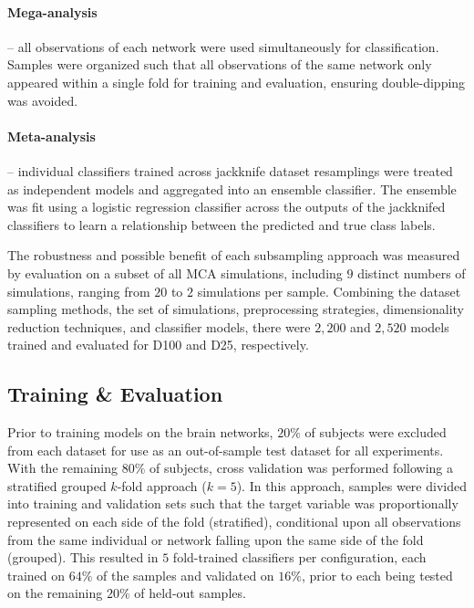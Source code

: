 \documentclass[fleqn,10pt]{SelfArx} %
\begin{document}
\paragraph{Mega-analysis} – all observations of each network were used simultaneously for classification. Samples were
organized such that all observations of the same network only appeared within a single fold for training and
evaluation, ensuring double-dipping was avoided.

\paragraph{Meta-analysis} – individual classifiers trained across jackknife dataset resamplings were treated as
independent models and aggregated into an ensemble classifier. The ensemble was fit using a logistic regression
classifier across the outputs of the jackknifed classifiers to learn a relationship between the predicted and true
class labels.

The robustness and possible benefit of each subsampling approach was measured by evaluation on a subset of all MCA
simulations, including $9$ distinct numbers of simulations, ranging from $20$ to $2$ simulations per sample. Combining
the dataset sampling methods, the set of simulations, preprocessing strategies, dimensionality reduction techniques,
and classifier models, there were $2,200$ and $2,520$ models trained and evaluated for D100 and D25, respectively.

\subsection*{Training \& Evaluation}

Prior to training models on the brain networks, $20\%$ of subjects were excluded from each dataset for use as an
out-of-sample test dataset for all experiments. With the remaining $80\%$ of subjects, cross validation was performed
following a stratified grouped $k$-fold approach ($k=5$). In this approach, samples were divided into training and
validation sets such that the target variable was proportionally represented on each side of the fold (stratified),
conditional upon all observations from the same individual or network falling upon the same side of the fold (grouped).
This resulted in $5$ fold-trained classifiers per configuration, each trained on $64\%$ of the samples and validated on
$16\%$, prior to each being tested on the remaining $20\%$ of held-out samples.
\end{document}

